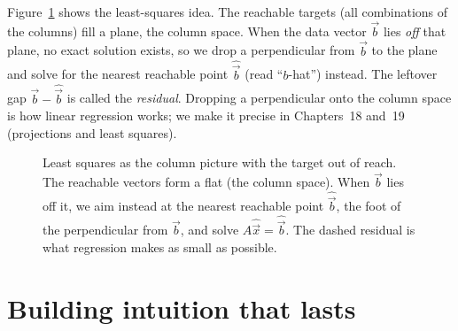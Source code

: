 Figure~\ref{ch06:leastsq} shows the least-squares idea. The reachable
targets (all combinations of the columns) fill a plane, the column space.
When the data vector $\vec b$ lies \emph{off} that plane, no exact solution
exists, so we drop a perpendicular from $\vec b$ to the plane and solve for
the nearest reachable point $\hat{\vec b}$ (read ``$b$-hat'') instead. The
leftover gap $\vec b-\hat{\vec b}$ is called the \emph{residual}. Dropping
a perpendicular onto the column space is how linear regression works; we
make it precise in Chapters~18 and~19 (projections and least squares).

\begin{figure}[H]
\centering
{}
\caption{Least squares as the column picture with the target out of reach.
The reachable vectors form a flat (the column space). When $\vec b$ lies off
it, we aim instead at the nearest reachable point $\hat{\vec b}$, the foot of
the perpendicular from $\vec b$, and solve $A\hat{\vec x}=\hat{\vec b}$. The
dashed residual is what regression makes as small as possible.}
\label{ch06:leastsq}
\end{figure}

\section{Building intuition that lasts}

